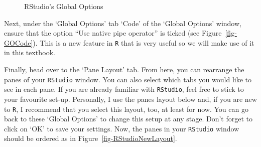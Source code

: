 \documentclass[
  letterpaper,
  DIV=11,
  numbers=noendperiod,
  oneside]{scrreprt}
\begin{document}
\begin{figure}
\begin{minipage}{0.50\linewidth}
{}


\end{minipage}%

\caption{\label{fig-GlobalOptions}RStudio's Global Options}

\end{figure}%

Next, under the `Global Options' tab `Code' of the `Global Options'
window, ensure that the option ``Use native pipe operator'' is ticked
(see Figure~\ref{fig-GOCode}). This is a new feature in \texttt{R} that
is very useful so we will make use of it in this textbook.

Finally, head over to the `Pane Layout' tab. From here, you can
rearrange the panes of your \texttt{RStudio} window. You can also select
which tabs you would like to see in each pane. If you are already
familiar with \texttt{RStudio}, feel free to stick to your favourite
set-up. Personally, I use the panes layout below and, if you are new to
\texttt{R}, I recommend that you select this layout, too, at least for
now. You can go back to these `Global Options' to change this setup at
any stage. Don't forget to click on `OK' to save your settings. Now, the
panes in your \texttt{RStudio} window should be ordered as in
Figure~\ref{fig-RStudioNewLayout}.
\end{document}
